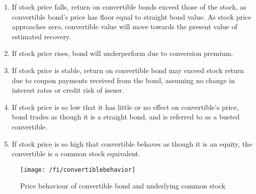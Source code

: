 \begin{remark} 
\begin{enumerate}[label=\roman*.]
\setlength{\itemsep}{0pt}
\item If stock price falls, return on convertible bonds exceed those of the stock, as convertible bond's price has floor equal to straight bond value. As stock price approaches zero, convertible value will move towards the present value of estimated recovery.
\item If stock price rises, bond will underperform due to conversion premium.
\item If stock price is stable, return on convertible bond may exceed stock return due to coupon payments received from the bond, assuming no change in interest rates or credit risk of issuer.
\item If stock price is so low that it has little or no effect on convertible's price, bond trades as though it is a straight bond, and is referred to as a busted convertible.
\item If stock price is so high that convertible behaves as though it is an equity, the convertible is a common stock equivalent.
\end{enumerate}
\end{remark}

\begin{figure}[H]
\centering
\texttt{[image: /fi/convertiblebehavior]}
\caption{Price behaviour of convertible bond and underlying common stock}
\end{figure}